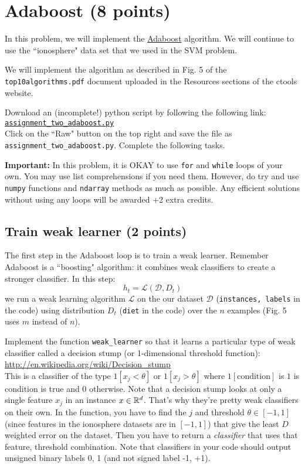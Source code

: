 \documentclass{article}
\begin{document}
\section{Adaboost (8 points)}

In this problem, we will implement the \href{http://en.wikipedia.org/wiki/AdaBoost}{Adaboost} algorithm.
We will continue to use the ``ionosphere" data set that we used in the SVM problem.

We will implement the algorithm as described in Fig. 5 of the {\tt top10algorithms.pdf} document uploaded in the Resources sections 
of the ctools website.

Download an (incomplete!) python script by following the following
link:\\
\href{https://github.com/ambujtewari/stats607a-fall2015/blob/master/homeworks/assignment\_two\_adaboost.py}{\tt assignment\_two\_adaboost.py} \\
Click on the ``Raw" button on the top right and save the file as {\tt assignment\_two\_adaboost.py}.
Complete the following tasks.

{\bf Important:} In this problem, it is OKAY to use {\tt for} and {\tt while} loops of your own. You may use list comprehensions if you need them.
However, do try and use {\tt numpy} functions and {\tt ndarray} methods as much as possible. Any efficient solutions without using any loops
will be awarded +2 extra credits.

\subsection{Train weak learner (2 points)}

The first step in the Adaboost loop is to train a weak learner. Remember Adaboost is a ``boosting" algorithm: it combines weak classifiers 
to create a stronger classifier. In this step:
$$
h_t = \mathcal{L}(\mathcal{D}, D_t)
$$
we run a weak learning algorithm $\mathcal{L}$ on the our dataset $\mathcal{D}$ ({\tt instances, labels} in the code) using distribution
$D_t$ ({\tt diet} in the code) over the $n$ examples (Fig. 5 uses $m$ instead of $n$).

Implement the function {\tt weak\_learner} so that it learns a particular type of weak classifier called a decision stump (or 1-dimensional
threshold function):\\
\url{http://en.wikipedia.org/wiki/Decision\_stump}\\
This is a classifier of the type $1[x_j < \theta]$ or $1[x_j > \theta]$ where $1[\text{condition}]$ is $1$ is condition is true and $0$ otherwise.
Note that a decision stump looks at only a single feature $x_j$ in an instance $x \in \mathbb{R}^d$. That's why they're pretty weak classifiers
on their own. In the function, you have to find the $j$ and threshold $\theta \in [-1,1]$ (since features in the ionosphere
datasets are in $[-1,1]$) that give the least $D$ weighted error on the dataset. Then you have to return a \emph{classifier}
that uses that feature, threshold combination. Note that classifiers in your code should output unsigned binary labels 0, 1
(and not signed label -1, +1).
\end{document}
